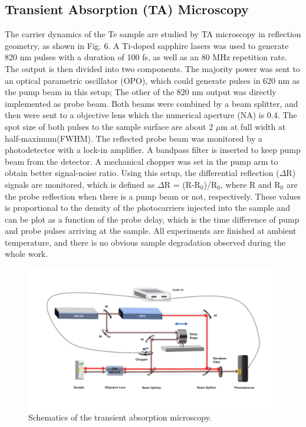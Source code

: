\documentclass[journal=jacsat,manuscript=article]{achemso}
\begin{document}
\subsection{Transient Absorption (TA) Microscopy}
The carrier dynamics of the Te sample are studied by TA microscopy in reflection geometry, as shown in Fig. 6. A Ti-doped sapphire lasers was used to generate 820 nm pulses with a duration of 100 fs, as well as an 80 MHz repetition rate. The output is then divided into two components. The majority power was sent to an optical parametric oscillator (OPO), which could generate pulses in 620 nm as the pump beam in this setup; The other of the 820 nm output was directly implemented as probe beam. Both beams were combined by a beam splitter, and then were sent to  a objective lens which the  numerical aperture (NA) is 0.4. The spot size of both pulses to the sample surface are about 2 $\mu$m at full width at half-maximum(FWHM). The reflected probe beam was monitored by a photodetector with a lock-in amplifier. A bandpass filter is inserted to keep pump beam from the detector. A mechanical chopper was set in the pump arm to obtain better signal-noise ratio. Using this setup, the differential reflection ($\Delta$R) signals are monitored, which is defined as $\Delta$R = (R-R$_0$)/R$_0$, where R and R$_0$ are the probe reflection when there is a pump beam or not, respectively. These values is proportional to the density of the photocarriers injected into the sample and can be plot as a function of the probe delay, which is the time difference of pump and probe pulses arriving at the sample. All experiments are finished at ambient temperature, and there is no obvious sample degradation observed during the whole work.

\begin{figure}
  \centering
  \includegraphics[width=\linewidth]{setup.pdf}
  \caption{Schematics of the transient absorption microscopy.}
    \label{fig:setup}
\end{figure}
\end{document}
